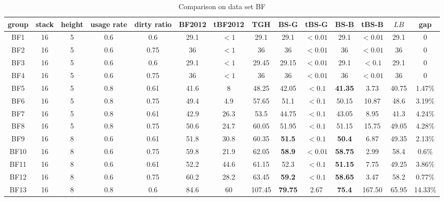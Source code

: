 \documentclass[review,3p,times,authoryear,12pt]{elsarticle}
\begin{document}
\begin{table}[!htb]
\caption{\label{tab:bf} Comparison on data set BF}
\scriptsize
\centering
\begin{tabular}{c|c|c|c|c|c|c|c|c|c|c|c|c|c}
  \hline
  group & stack & height & usage rate & dirty ratio & BF2012 & tBF2012 & TGH   & BS-G  & tBS-G & BS-B  & tBS-B & $\mathit{LB}$ & gap\\
    \hline
    BF1   & 16 & 5  & 0.6 & 0.6  & 29.1  & $<1$  & 29.1   & 29.1          & $<0.01$ & 29.1           & $<0.01$ & 29.1  & 0\\
    BF2   & 16 & 5  & 0.6 & 0.75 & 36    & $<1$  & 36     & 36            & $<0.01$ & 36             & $<0.01$ & 36    & 0\\
    BF3   & 16 & 5  & 0.6 & 0.6  & 29.1  & $<1$  & 29.45  & 29.15         & $<0.01$ & 29.1           & $<0.1$  & 29.1  & 0\\
    BF4   & 16 & 5  & 0.6 & 0.75 & 36    & $<1$  & 36     & 36            & $<0.01$ & 36             & $<0.01$ & 36    & 0\\
    BF5   & 16 & 5  & 0.8 & 0.61 & 41.6  & 8     & 48.25  & 42.05         & $<0.1$  & \textbf{41.35} & 3.73    & 40.75 & 1.47\%\\
    BF6   & 16 & 5  & 0.8 & 0.75 & 49.4  & 4.9   & 57.65  & 51.1          & $<0.1$  & 50.15          & 10.87   & 48.6  & 3.19\%\\
    BF7   & 16 & 5  & 0.8 & 0.61 & 42.9  & 26.3  & 53.5   & 44.75         & $<0.1$  & 43.05          & 8.95    & 41.3  & 4.24\%\\
    BF8   & 16 & 5  & 0.8 & 0.75 & 50.6  & 24.7  & 60.05  & 51.95         & $<0.1$  & 51.15          & 15.75   & 49.05 & 4.28\%\\
    BF9   & 16 & 8  & 0.6 & 0.61 & 51.8  & 30.8  & 60.35  & \textbf{51.5} & $<0.1$  & \textbf{50.4}  & 6.87    & 49.35 & 2.13\%\\
    BF10  & 16 & 8  & 0.6 & 0.75 & 59.8  & 21.9  & 62.05  & \textbf{58.9} & $<0.01$ & \textbf{58.75} & 2.99    & 58.4  & 0.6\%\\
    BF11  & 16 & 8  & 0.6 & 0.61 & 52.2  & 44.6  & 61.15  & 52.3          & $<0.1$  & \textbf{51.15} & 7.75    & 49.25 & 3.86\%\\
    BF12  & 16 & 8  & 0.6 & 0.75 & 60.2  & 28.2  & 63.45  & \textbf{59.2} & $<0.1$  & \textbf{58.65} & 3.47    & 58.2  & 0.77\%\\
    BF13  & 16 & 8  & 0.8 & 0.6  & 84.6  & 60    & 107.45 & \textbf{79.75}& 2.67    & \textbf{75.4}  & 167.50  & 65.95 & 14.33\%\\

\end{tabular}
\end{table}
\end{document}
